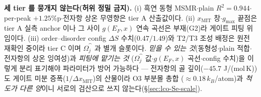 \begin{warnbox}
\textbf{세 tier 를 뭉개지 않는다(허위 정밀 금지).} (i) 흑연 동형 MSMR$\cdot$plain $R^2=0.944$$\cdot$per-peak
$+1.25$\%p$\cdot$전자항 상온 무영향은 tier A 산출값이다. (ii) $x_\mathrm{MIT}$ 창$\cdot$$g_{\max}$ 끝점은
tier A 실측 anchor 이나 그 사이 $g(E_F,x)$ 연속 곡선은 부재(G2)라 게이트 피팅 위임이다. (iii) order--disorder
config $\Delta S$ 수치($0.47/1.49$)와 T2/T3 조성 배정은 원전 재확인 중이라 tier C 이며 $\Omega_j^\cat$ 과 별개
슬롯이다. \emph{믿을 수 있는 것}(동형성$\cdot$plain 적합$\cdot$전자항의 상온 잉여성)과 \emph{피팅에 맡기는 것}
($\Omega_j^\cat$ 값$\cdot$$g(E_F,x)$ 곡선$\cdot$config 수치)을 이렇게 분리 표기해야 파라미터가 방어 가능하다 ---
전자항의 골 깊이($-45.7$ J/(mol\,K))도 게이트 미분 증폭($1/\Delta x_\mathrm{MIT}$)의 산물이라 O3 부분몰 총합
($\approx0.18\,k_B$/atom)과 \emph{척도가 다른 양}이니 서로의 검산으로 쓰지 않는다(\S\ref{sec:lco-Se-scale}).
\end{warnbox}

